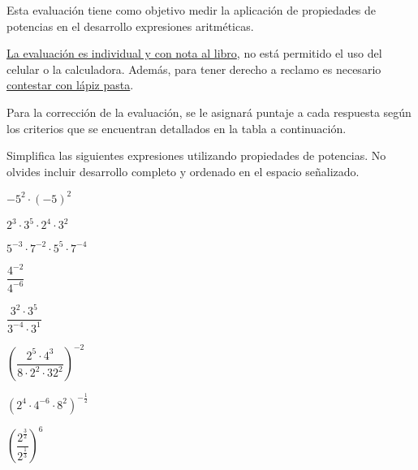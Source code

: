 \documentclass{caes}
\begin{document}
\datos
{}

Esta evaluación tiene como objetivo medir la aplicación de propiedades de 
potencias en el desarrollo expresiones aritméticas.  

\underline{La evaluación es individual y con nota al libro}, no está permitido 
el uso del celular o la calculadora. Además, para tener derecho a 
reclamo es necesario \underline{contestar con lápiz pasta}.


Para la corrección de la evaluación, se le asignará puntaje a cada respuesta 
según los criterios que se encuentran detallados en la tabla a continuación.

\pauta

\parte Simplifica las siguientes expresiones utilizando propiedades de potencias. 
No olvides incluir desarrollo completo y ordenado en el espacio señalizado.

\pregunta $-5^2\cdot (-5)^2$
\desarrollo

\newpage
\pregunta $2^3 \cdot 3^5 \cdot 2^4 \cdot 3^2$
\desarrollo[4cm]

\pregunta $5^{-3}\cdot 7^{-2} \cdot 5^{5} \cdot 7^{-4}$
\desarrollo[4.5cm]

\pregunta $\dfrac{4^{-2}}{4^{-6}}$
\desarrollo[4.5cm]

\pregunta $\dfrac{3^2 \cdot 3^5}{3^{-4} \cdot 3^{1}}$
\desarrollo[4.5cm]

\pregunta $\left(\dfrac{2^5 \cdot 4^3}{8\cdot 2^2 \cdot 32^2}\right)^{-2}$
\desarrollo[4.5cm]

\pregunta $(2^4 \cdot 4^{-6} \cdot 8^2)^{-\frac{1}{2}}$
\desarrollo[4.5cm]

\pregunta $\left(\dfrac{2^{\frac{3}{2}}}{2^{\frac{1}{3}}}\right)^6$
\desarrollo[4.5cm]
\end{document}
